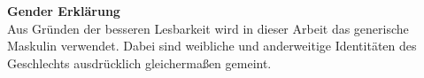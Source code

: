 \newpage
\noindent\begin{minipage}[c][.99\textheight][c]{\textwidth}
	\centering
	\begin{minipage}{.65\linewidth}
		\textbf{Gender Erklärung}\\
		\newline
		Aus Gründen der besseren Lesbarkeit wird in dieser Arbeit das generische Maskulin verwendet. Dabei sind weibliche und anderweitige Identitäten des Geschlechts ausdrücklich gleichermaßen gemeint.
	\end{minipage}
\end{minipage}